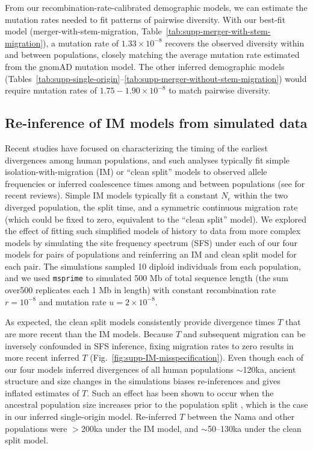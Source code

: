 \documentclass[]{article}
\newcommand{\msprime}{\texttt{msprime}\xspace}
\begin{document}
From our recombination-rate-calibrated demographic models, we can estimate the
mutation rates needed to fit patterns of pairwise diversity. With our best-fit
model (merger-with-stem-migration,
Table~\ref{tab:supp-merger-with-stem-migration}), a mutation rate of
$1.33\times10^{-8}$ recovers the observed diversity within and between
populations, closely matching the average mutation rate estimated from the
gnomAD mutation model. The other inferred demographic models
(Tables~\ref{tab:supp-single-origin}--\ref{tab:supp-merger-without-stem-migration})
would require mutation rates of $1.75-1.90\times10^{-8}$ to match pairwise
diversity.

\subsection{Re-inference of IM models from simulated data}
\label{sec:IM-reinfer}

Recent studies have focused on characterizing the timing of the earliest
divergences among human populations, and such analyses
typically fit simple isolation-with-migration (IM) or ``clean split'' models to
observed allele frequencies or inferred coalescence times among and between
populations (see \citet{Weaver2008-ho,Bergstrom2021-iw} for recent reviews).
Simple IM models
typically fit a constant $N_e$ within the two diverged population, the split
time, and a symmetric continuous migration rate (which could be fixed to zero,
equivalent to the ``clean split'' model). We explored the effect of fitting
such simplified models of history to data from more complex models by
simulating the site frequency spectrum (SFS) under each of our four models for
pairs of populations and reinferring an IM and clean split model for each pair.
The simulations sampled 10 diploid individuals from each
population, and we used \msprime \citep{Baumdicker2022-mj} to simulated
500 Mb of total sequence length (the sum over500 replicates each 1 Mb in length)
with constant recombination rate $r=10^{-8}$ and mutation rate $u=2\times10^{-8}.$

As expected, the clean split models consistently provide divergence times $T$
that are more recent than the IM models. Because $T$ and subsequent migration
can be inversely confounded in SFS inference, fixing migration rates to zero
results in more recent inferred $T$ (Fig.~\ref{fig:supp-IM-misspecification}).
Even though each of our four models inferred divergences of all human
populations $\sim$120ka, ancient structure and size changes in the simulations
biases re-inferences and gives inflated estimates of $T$.
Such an effect has been shown to occur when the ancestral
population size increases prior to the population split
\citep{Momigliano2021-th}, which is the case in our inferred single-origin model.
Re-inferred $T$ between the Nama and other populations were $>$200ka under the IM model,
and $\sim$50--130ka under the clean split model.
\end{document}

